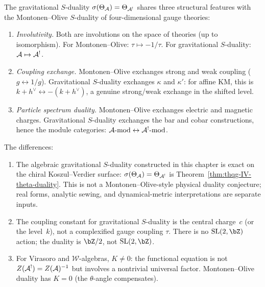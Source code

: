 \begin{remark}
The gravitational $S$-duality $\sigma(\Theta_{\mathcal{A}}) = \Theta_{\mathcal{A}^!}$
shares three structural features with the Montonen--Olive $S$-duality
of four-dimensional gauge theories:
\begin{enumerate}[label=\textup{(\roman*)}]
\item \emph{Involutivity.} Both are involutions on the space of
 theories (up to isomorphism). For Montonen--Olive: $\tau \mapsto -1/\tau$.
 For gravitational $S$-duality: $\mathcal{A} \mapsto \mathcal{A}^!$.
\item \emph{Coupling exchange.} Montonen--Olive exchanges strong and
 weak coupling ($g \leftrightarrow 1/g$). Gravitational $S$-duality
 exchanges $\kappa$ and $\kappa'$: for affine KM, this is
 $k + h^\vee \leftrightarrow -(k + h^\vee)$, a genuine strong/weak
 exchange in the shifted level.
\item \emph{Particle spectrum duality.} Montonen--Olive exchanges
 electric and magnetic charges. Gravitational $S$-duality exchanges
 the bar and cobar constructions, hence the module categories:
 $\mathcal{A}\text{-mod} \leftrightarrow \mathcal{A}^!\text{-mod}$.
\end{enumerate}

The differences:
\begin{enumerate}[label=\textup{(\roman*)}]
\item The algebraic gravitational $S$-duality constructed in this
 chapter is exact on the chiral Koszul--Verdier surface:
 $\sigma(\Theta_{\mathcal{A}})=\Theta_{\mathcal{A}^!}$ is Theorem~\ref{thm:thqg-IV-theta-duality}.
 This is not a Montonen--Olive-style physical duality conjecture; real
 forms, analytic sewing, and dynamical-metric interpretations are
 separate inputs.
\item The coupling constant for gravitational $S$-duality is
 the central charge~$c$ (or the level~$k$), not a complexified gauge
 coupling $\tau$. There is no $\mathrm{SL}(2, \bZ)$
 action; the duality is $\bZ/2$, not $\mathrm{SL}(2, \bZ)$.
\item For Virasoro and $\mathcal{W}$-algebras, $K \neq 0$: the
 functional equation is not $Z(\mathcal{A}^!) = Z(\mathcal{A})^{-1}$ but involves a
 nontrivial universal factor. Montonen--Olive duality has $K = 0$
 (the $\theta$-angle compensates).
\end{enumerate}
\end{remark}

